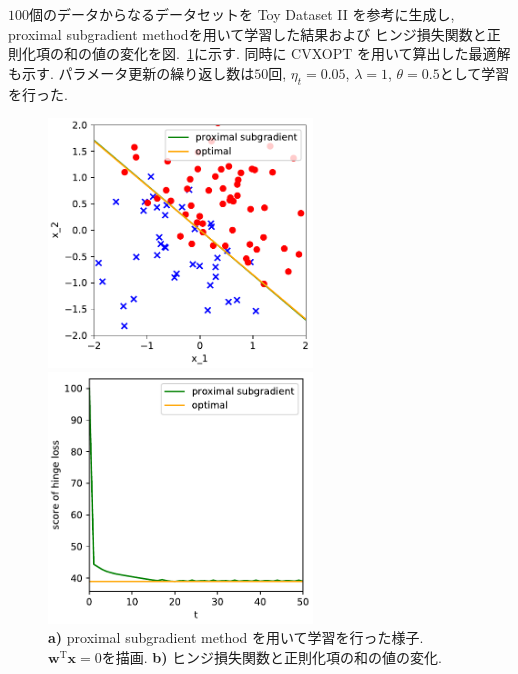 \documentclass[a4paper,10pt]{jsarticle}
\begin{document}
$100$個のデータからなるデータセットを Toy Dataset I\hspace{-1pt}I を参考に生成し,
proximal subgradient methodを用いて学習した結果および
ヒンジ損失関数と正則化項の和の値の変化を図.~\ref{img:proximal-subgradient}に示す.
同時に CVXOPT を用いて算出した最適解も示す.
パラメータ更新の繰り返し数は$50$回, $\eta_t=0.05$, $\lambda=1$, $\theta=0.5$として学習を行った.
\begin{figure}[htbp]
 \begin{minipage}{0.5\hsize}
  \begin{center}
   \includegraphics[width=7cm]{figs/p4_proximal-subgradient_result.pdf}
  \end{center}
  \vspace{-0.5cm}
  \subcaption{}
 \end{minipage}
 \begin{minipage}{0.5\hsize}
  \begin{center}
   \includegraphics[width=7cm]{figs/p4_proximal-subgradient_loss.pdf}
  \end{center}
  \vspace{-0.5cm}
  \subcaption{}
 \end{minipage}
 \caption{\textbf{a)} proximal subgradient method を用いて学習を行った様子.
 $\bm{w}^\mathrm{T}\bm{x}=0$を描画.
 \textbf{b)} ヒンジ損失関数と正則化項の和の値の変化.}
 \label{img:proximal-subgradient}
\end{figure}
\end{document}
